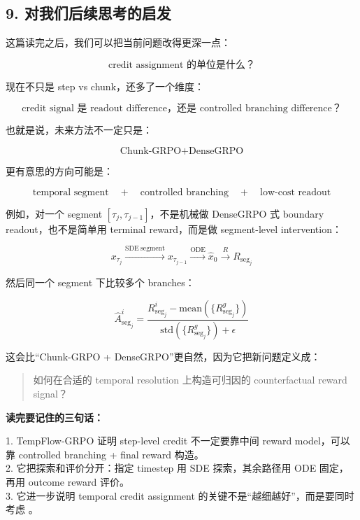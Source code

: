 \subsection{9. 对我们后续思考的启发}

这篇读完之后，我们可以把当前问题改得更深一点：

\[
\text{credit assignment 的单位是什么？}
\]

现在不只是 step vs chunk，还多了一个维度：

\[
\text{credit signal 是 readout difference，还是 controlled branching difference？}
\]

也就是说，未来方法不一定只是：

\[
\text{Chunk-GRPO} + \text{DenseGRPO}
\]

更有意思的方向可能是：

\[
\text{temporal segment}
\quad + \quad
\text{controlled branching}
\quad + \quad
\text{low-cost readout}
\]

例如，对一个 segment \([\tau_j,\tau_{j-1}]\)，不是机械做 DenseGRPO 式 boundary readout，也不是简单用 terminal reward，而是做 segment-level intervention：

\[
x_{\tau_j}
\xrightarrow{\mathrm{SDE\ segment}}
x_{\tau_{j-1}}
\xrightarrow{\mathrm{ODE}}
\hat{x}_0
\xrightarrow{R}
R_{\mathrm{seg}_j}
\]

然后同一个 segment 下比较多个 branches：

\[
\hat{A}_{\mathrm{seg}_j}^i
=
\frac{
R_{\mathrm{seg}_j}^i-\mathrm{mean}(\{R_{\mathrm{seg}_j}^g\})
}{
\mathrm{std}(\{R_{\mathrm{seg}_j}^g\})+\epsilon
}
\]

这会比“Chunk-GRPO + DenseGRPO”更自然，因为它把新问题定义成：

\begin{quote}
如何在合适的 temporal resolution 上构造可归因的 counterfactual reward signal？
\end{quote}

\begin{summarybox}
\textbf{读完要记住的三句话：}

1. TempFlow-GRPO 证明 step-level credit 不一定要靠中间 reward model，可以靠 controlled branching + final reward 构造。\\
2. 它把探索和评价分开：指定 timestep 用 SDE 探索，其余路径用 ODE 固定，再用 outcome reward 评价。\\
3. 它进一步说明 temporal credit assignment 的关键不是“越细越好”，而是要同时考虑 。
\end{summarybox}
